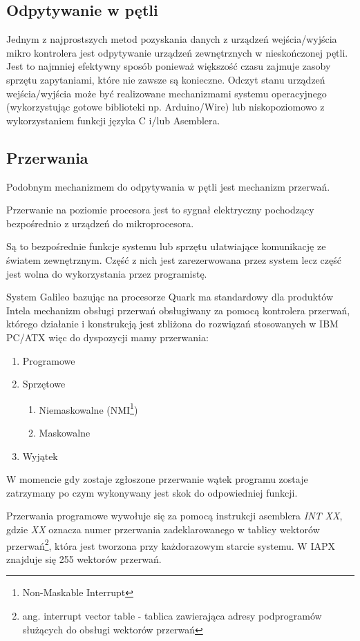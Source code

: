 \documentclass{xmgr}
\begin{document}
\subsection{Odpytywanie w pętli}
Jednym z najprostszych metod pozyskania danych z urządzeń wejścia/wyjścia mikro kontrolera jest odpytywanie urządzeń zewnętrznych w nieskończonej pętli. Jest to najmniej efektywny sposób ponieważ większość czasu zajmuje zasoby sprzętu zapytaniami, które nie zawsze są konieczne. Odczyt stanu urządzeń wejścia/wyjścia może być realizowane mechanizmami systemu operacyjnego (wykorzystując gotowe biblioteki np. Arduino/Wire) lub niskopoziomowo z wykorzystaniem funkcji języka C i/lub Asemblera.

\subsection{Przerwania}
Podobnym mechanizmem do odpytywania w pętli jest mechanizm przerwań. 

Przerwanie na poziomie procesora jest to sygnał elektryczny pochodzący bezpośrednio z urządzeń do mikroprocesora.

Są to bezpośrednie funkcje systemu lub sprzętu ułatwiające komunikację ze światem zewnętrznym. Część z nich jest zarezerwowana przez system lecz część jest wolna do wykorzystania przez programistę.

System Galileo bazując na procesorze Quark ma standardowy dla produktów Intela mechanizm obsługi przerwań obsługiwany za pomocą kontrolera przerwań, którego działanie i konstrukcją jest zbliżona do rozwiązań stosowanych w IBM PC/ATX więc do dyspozycji mamy przerwania:
\begin{enumerate}
	\item Programowe
	\item Sprzętowe
	\begin{enumerate}
		\item Niemaskowalne (NMI\footnote{Non-Maskable Interrupt})
		\item Maskowalne
	\end{enumerate}
	\item Wyjątek
\end{enumerate}

W momencie gdy zostaje zgłoszone przerwanie wątek programu zostaje zatrzymany po czym wykonywany jest skok do odpowiedniej funkcji.

Przerwania programowe wywołuje się za pomocą instrukcji asemblera \emph{INT XX}, gdzie \emph{XX} oznacza numer przerwania zadeklarowanego w tablicy wektorów przerwań\footnote{ang. interrupt vector table - tablica zawierająca adresy podprogramów służących do obsługi wektorów przerwań}, która jest tworzona przy każdorazowym starcie systemu. W IAPX znajduje się 255 wektorów przerwań.
\end{document}
